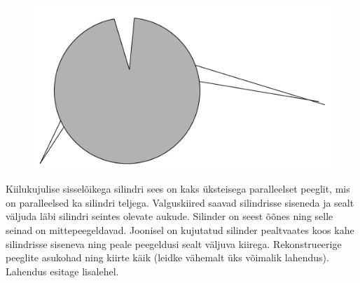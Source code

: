 \setAuthor{}

\begin{figure}
  \vspace{-25pt}
  \begin{center}
  \includegraphics[scale=0.25]{2020-v3g-08-yl.pdf}
  \end{center}
  \vspace{-25pt}
\end{figure}
Kiilukujulise sisselõikega silindri sees on kaks üksteisega paralleelset peeglit,
mis on paralleelsed ka silindri teljega. Valguskiired saavad silindrisse siseneda
ja sealt väljuda läbi silindri seintes olevate aukude. Silinder on seest õõnes
ning selle seinad on mittepeegeldavad. Joonisel on kujutatud
silinder pealtvaates koos kahe silindrisse siseneva ning peale peegeldusi sealt
väljuva kiirega. Rekonstrueerige peeglite asukohad ning kiirte käik (leidke
vähemalt üks võimalik lahendus). Lahendus esitage lisalehel.


\hint

